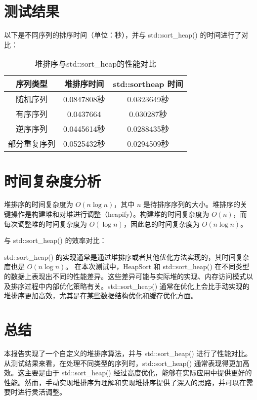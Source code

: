\documentclass{article}
\begin{document}
	\section{测试结果}
	以下是不同序列的排序时间（单位：秒），并与 std::sort\_heap() 的时间进行了对比：
	
	\begin{table}[h!]
		\centering
		\begin{tabular}{|c|c|c|}
			\hline
			\textbf{序列类型} & \textbf{堆排序时间} & \textbf{std::sortheap 时间} \\
			\hline
			随机序列 & 0.0847808秒 & 0.0323649秒 \\
			有序序列 & 0.0437664 & 0.030287秒 \\
			逆序序列 & 0.0445614秒 & 0.0288435秒 \\
			部分重复序列 & 0.0525432秒 & 0.0294509秒 \\
			\hline
		\end{tabular}
		\caption{堆排序与std::sort\_heap的性能对比}
	\end{table}
	
	\section{时间复杂度分析}
	堆排序的时间复杂度为 $O(n \log n)$，其中 $n$ 是待排序序列的大小。堆排序的关键操作是构建堆和对堆进行调整（heapify）。构建堆的时间复杂度为 $O(n)$，而每次调整堆的时间复杂度为 $O(\log n)$，因此总的时间复杂度为 $O(n \log n)$。
	
	与 std::sort\_heap() 的效率对比：
	
	std::sort\_heap() 的实现通常是通过堆排序或者其他优化方法实现的，其时间复杂度也是 $O(n \log n)$。
	在本次测试中，HeapSort 和 std::sort\_heap() 在不同类型的数据上表现出不同的性能差异。这些差异可能与实际堆的实现、内存访问模式以及排序过程中内部优化策略有关。std::sort\_heap() 通常在优化上会比手动实现的堆排序更加高效，尤其是在某些数据结构优化和缓存优化方面。
	
	\section{总结}
	本报告实现了一个自定义的堆排序算法，并与 std::sort\_heap() 进行了性能对比。从测试结果来看，在处理不同类型的序列时，std::sort\_heap() 通常表现得更加高效。这主要是由于 std::sort\_heap() 经过高度优化，能够在实际应用中提供更好的性能。然而，手动实现堆排序为理解和实现堆排序提供了深入的思路，并可以在需要时进行灵活调整。
	
\end{document}
